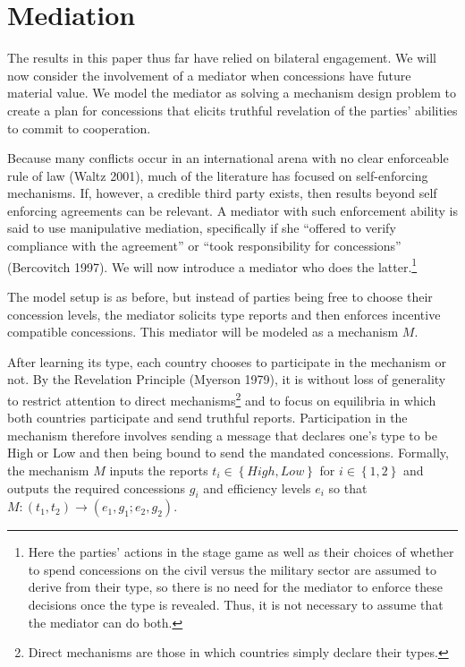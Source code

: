 \documentclass[12pt, letterpaper]{article}
\begin{document}
\section{Mediation}
\label{sec:med}
The results in this paper thus far have relied on bilateral engagement. We will now consider the involvement of a mediator when concessions have future material value. We model the mediator as solving a mechanism design problem to create a plan for concessions that elicits truthful revelation of the parties' abilities to commit to cooperation. 

Because many conflicts occur in an international arena with no clear enforceable rule of law (Waltz 2001), much of the literature has focused on self-enforcing mechanisms. If, however, a credible third party exists, then results beyond self enforcing agreements can be relevant.  A mediator with such enforcement ability is said to use manipulative mediation, specifically if she ``offered to verify compliance with the agreement''  or ``took responsibility for concessions''  (Bercovitch 1997). We will now introduce a mediator who does the latter.\footnote{Here the parties' actions in the stage game as well as their choices of whether to spend concessions on the civil versus the military sector are assumed to derive from their type, so there is no need for the mediator to enforce these decisions once the type is revealed. Thus, it is not necessary to assume that the mediator can do both.} 

The model setup is as before, but instead of parties being free to choose their concession levels, the mediator solicits type reports and then enforces incentive compatible concessions. This mediator will be modeled as a mechanism $M$.

After learning its type, each country chooses to participate in the mechanism or not. By the Revelation Principle (Myerson 1979), it is without loss of generality to restrict attention to direct mechanisms\footnote{Direct mechanisms are those in which countries simply declare their types.} and to focus on equilibria in which both countries participate and send truthful reports. Participation in the mechanism therefore involves sending a message that declares one's type to be High or Low and then being bound to send the mandated concessions. Formally, the mechanism $M$ inputs the reports $t_i \in \left\{High,Low\right\}$ for $i \in \left\{1,2\right\}$ and outputs the required concessions $g_i$ and efficiency levels $e_i$ so that $ M:(t_1,t_2)\rightarrow( e_1, g_1; e_2,g_2)$.
\end{document}
